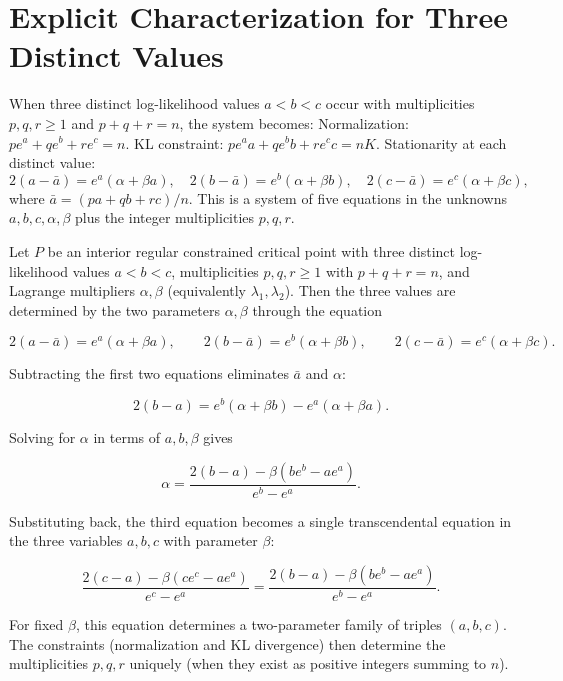 \section{Explicit Characterization for Three Distinct Values}\label{ch:sec:explicit-characterisation-for-three-distinct-values}
When three distinct log-likelihood values \(a<b<c\) occur with multiplicities \(p,q,r\ge1\) and \(p+q+r=n\), the system becomes:
Normalization: \(p e^{a}+q e^{b}+r e^{c}=n\).
KL constraint: \(p e^{a}a+q e^{b}b+r e^{c}c=nK\).
Stationarity at each distinct value:
\[
2(a-\bar a)=e^{a}(\alpha+\beta a),\quad
2(b-\bar a)=e^{b}(\alpha+\beta b),\quad
2(c-\bar a)=e^{c}(\alpha+\beta c),
\]
where \(\bar a=(p a+q b+r c)/n\).
This is a system of five equations in the unknowns \(a,b,c,\alpha,\beta\) plus the integer multiplicities \(p,q,r\).

\begin{theorem}
\label{ch:thm:three-level-param}
Let \(P\) be an interior regular constrained critical point with three distinct log-likelihood values \(a<b<c\), multiplicities \(p,q,r\ge1\) with \(p+q+r=n\), and Lagrange multipliers \(\alpha,\beta\) (equivalently \(\lambda_1,\lambda_2\)).  Then the three values are determined by the two parameters \(\alpha,\beta\) through the equation

\[
2(a-\bar a) = e^{a}(\alpha+\beta a),\qquad
2(b-\bar a) = e^{b}(\alpha+\beta b),\qquad
2(c-\bar a) = e^{c}(\alpha+\beta c).
\]

Subtracting the first two equations eliminates \(\bar a\) and \(\alpha\):

\[
2(b-a) = e^{b}(\alpha+\beta b) - e^{a}(\alpha+\beta a).
\]

Solving for \(\alpha\) in terms of \(a,b,\beta\) gives

\[
\alpha = \frac{2(b-a) - \beta(b e^{b} - a e^{a})}{e^{b} - e^{a}}.
\]

Substituting back, the third equation becomes a single transcendental
equation in the three variables \(a,b,c\) with parameter \(\beta\):

\[
\frac{2(c-a) - \beta(c e^{c} - a e^{a})}{e^{c} - e^{a}}
=
\frac{2(b-a) - \beta(b e^{b} - a e^{a})}{e^{b} - e^{a}}.
\]

For fixed \(\beta\), this equation determines a two-parameter family of
triples \((a,b,c)\).  The constraints (normalization and KL divergence)
then determine the multiplicities \(p,q,r\) uniquely (when they exist as
positive integers summing to \(n\)).
\end{theorem}

